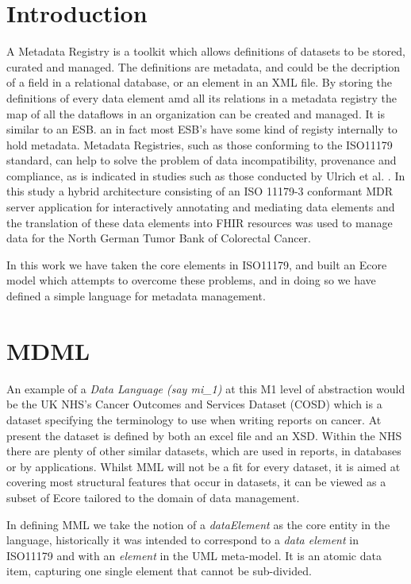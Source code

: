 \documentclass[conference]{IEEEtran}
\begin{document}





\section{Introduction}
A Metadata Registry is a toolkit which allows definitions of datasets to be stored, curated and managed. The definitions are metadata, and could be the decription of a field in a relational database, or an element in an XML file. By storing the definitions of every data element amd all its relations in a metadata registry the map of all the dataflows in an organization can be created and managed. It is similar to an ESB. an in fact most ESB's have some kind of registy internally to hold metadata. Metadata Registries, such as those conforming to the ISO11179 standard, can help to solve the problem of data incompatibility, provenance and compliance, as is indicated in studies such as those conducted by Ulrich et al. \cite{MDRHL7} . In this study a hybrid architecture consisting of an ISO 11179-3 conformant MDR server application for interactively annotating and mediating data elements and the translation of these data elements into FHIR resources was used to manage data for the North German Tumor Bank of Colorectal Cancer. 


In this work we have taken the core elements in ISO11179, and built an Ecore model which attempts to overcome these problems, and in doing so we have defined a simple language for metadata management.

\section{MDML}

 

An example of a \emph{Data Language (say mi\_1)} at this M1 level of abstraction would be the UK NHS's Cancer Outcomes and Services Dataset (COSD) which is a dataset specifying the terminology to use when writing reports on cancer. At present the dataset is defined by both an excel file and an XSD.  Within the NHS there are plenty of other similar datasets, which are used in reports, in databases or by applications.  Whilst MML will not be a fit for every dataset, it is aimed at covering most structural features that occur in datasets, it can be viewed as a subset of Ecore tailored to the domain of data management.

In defining MML we take the notion of a \emph{dataElement} as the core entity in the language, historically it was intended to correspond to a \emph{data element} in ISO11179 and with an \emph{element} in the UML meta-model. It is an atomic data item, capturing one single element that cannot be sub-divided.
\end{document}

